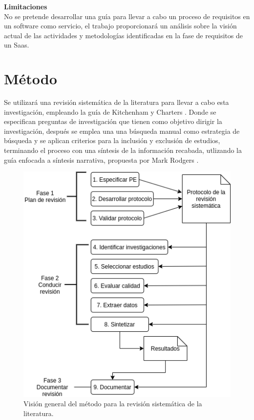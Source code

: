 \documentclass{article}
\begin{document}
\textbf{Limitaciones} \\
No se pretende desarrollar una guía para llevar a cabo un proceso de requisitos en un software como servicio, el trabajo 
proporcionará un análisis sobre la visión actual de las actividades y metodologías identificadas en la fase de requisitos de un Saas.  
\newpage

\section{Método}
Se utilizará una revisión sistemática de la literatura para llevar a cabo esta investigación, 
empleando la guía de Kitchenham y Charters \cite{metodo}. Donde se especifican preguntas de investigación que tienen 
como objetivo dirigir la investigación, después se emplea una una búsqueda manual como estrategia de búsqueda y 
se aplican criterios para la inclusión y exclusión de estudios, terminando el proceso con una síntesis de la información 
recabada, utlizando la guía enfocada a síntesis narrativa, 
propuesta por Mark Rodgers \cite{sintesisnarrativa}.

\begin{figure}[!htb]
   \includegraphics[width=\linewidth]{metodo.png}
   \caption{Visión general del método para la revisión sistemática de la literatura.}
   \label{fig:etapasconducción}
\end{figure}
\end{document}
